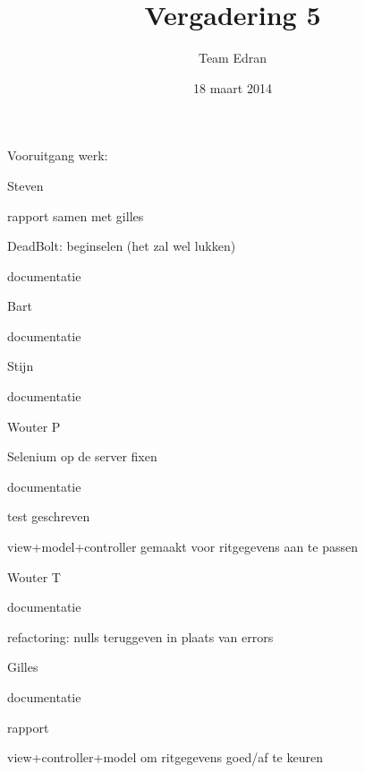 \documentclass[11pt,a4paper,oneside]{article}
\title{Vergadering 5}
\author{Team Edran}
\date{18 maart 2014}
\renewenvironment{itemize}[1]{\begin{compactitem}#1}{\end{compactitem}}
\begin{document}
	\begin{itemize}
		
		\item Vooruitgang werk:
        \begin{itemize}
        	\item Steven
              \begin{itemize}
                  \item rapport samen met gilles
                  \item DeadBolt: beginselen (het zal wel lukken)
                  \item documentatie
              \end{itemize}
           	\item Bart
              \begin{itemize}
                  \item documentatie
              \end{itemize}
            \item Stijn
              \begin{itemize}
                  \item documentatie
              \end{itemize}
            \item Wouter P
              \begin{itemize}
                  \item Selenium op de server fixen
                  \item documentatie
                  \item test geschreven
                  \item view+model+controller gemaakt voor ritgegevens aan te passen
              \end{itemize}
            \item Wouter T
              \begin{itemize}
                  \item documentatie
                  \item refactoring: nulls teruggeven in plaats van errors
              \end{itemize}
            \item Gilles
              \begin{itemize}
                  \item documentatie
                  \item rapport
                  \item view+controller+model om ritgegevens goed/af te keuren

\end{itemize}
\end{itemize}
\end{itemize}
\end{document}
